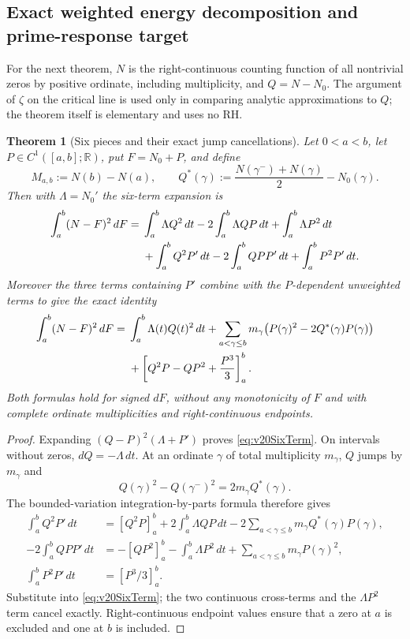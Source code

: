 \documentclass[11pt,reqno]{amsart}
\numberwithin{equation}{section}
\newtheorem{theorem}{Theorem}[section]
\newcommand{\R}{\mathbb R}
\begin{document}
\subsection{Exact weighted energy decomposition and prime-response target}
For the next theorem, $N$ is the right-continuous counting function
of all nontrivial zeros by positive ordinate, including multiplicity,
and $Q=N-N_0$.  The argument of $\zeta$ on the critical line is
used only in comparing analytic approximations to $Q$; the theorem
itself is elementary and uses no RH.
\begin{theorem}[Six pieces and their exact jump cancellations]
\label{thm:v20SixPieces}
Let $0<a<b$, let $P\in C^1([a,b];\R)$, put $F=N_0+P$,
and define
\[M_{a,b}:=N(b)-N(a),\qquad
Q^*(\gamma):=\frac{N(\gamma^-)+N(\gamma)}2-N_0(\gamma).
\]
Then with $\Lambda=N_0'$ the six-term expansion is
\begin{align}\label{eq:v20SixTerm}
\int_a^b(N-F)^2\,dF
={}&\int_a^b\Lambda Q^2\,dt
 -2\int_a^b\Lambda QP\,dt
 +\int_a^b\Lambda P^2\,dt\notag\\
&+\int_a^bQ^2P'\,dt
 -2\int_a^bQPP'\,dt
 +\int_a^bP^2P'\,dt.
\end{align}
Moreover the three terms containing $P'$ combine with the
$P$-dependent unweighted terms to give the exact identity
\begin{align}\label{eq:v20JumpReduction}
\int_a^b(N-F)^2\,dF
={}&\int_a^b\Lambda(t)Q(t)^2\,dt
 +\sum_{a<\gamma\le b}m_\gamma
 \bigl(P(\gamma)^2-2Q^*(\gamma)P(\gamma)\bigr)\notag\\
 &+\left[Q^2P-QP^2+\frac{P^3}3\right]_a^b.
\end{align}
Both formulas hold for signed $dF$, without any monotonicity of $F$
and with complete ordinate multiplicities and right-continuous endpoints.
\end{theorem}
\begin{proof}
Expanding $(Q-P)^2(\Lambda+P')$ proves
\eqref{eq:v20SixTerm}.  On intervals without zeros,
$dQ=-\Lambda\,dt$.  At an ordinate $\gamma$ of total
multiplicity $m_\gamma$, $Q$ jumps by $m_\gamma$ and
\[Q(\gamma)^2-Q(\gamma^-)^2=2m_\gamma Q^*(\gamma).
\]
The bounded-variation integration-by-parts formula therefore gives
\begin{align*}
\int_a^bQ^2P'\,dt
&=[Q^2P]_a^b+2\int_a^b\Lambda QP\,dt
 -2\sum_{a<\gamma\le b}m_\gamma Q^*(\gamma)P(\gamma),\\
-2\int_a^bQPP'\,dt
&=-[QP^2]_a^b-\int_a^b\Lambda P^2\,dt
 +\sum_{a<\gamma\le b}m_\gamma P(\gamma)^2,\\
\int_a^bP^2P'\,dt&=\left[P^3/3\right]_a^b.
\end{align*}
Substitute into \eqref{eq:v20SixTerm}; the two continuous
cross-terms and the $\Lambda P^2$ term cancel exactly.
Right-continuous endpoint values ensure that a zero at $a$ is
excluded and one at $b$ is included.
\end{proof}
\end{document}
